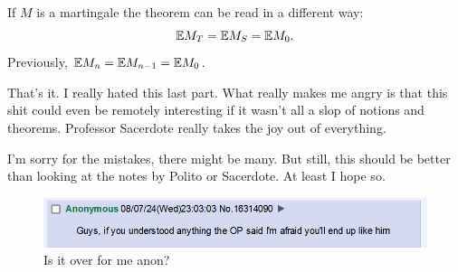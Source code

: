 \documentclass{report}
\begin{document}
\begin{remark}
	If $M$ is a martingale the theorem can be read in a different way:
	\begin{equation*}
		\mathbb{E} M_{T}=\mathbb{E} M_{S}=\mathbb{E} M_{0}.
	\end{equation*}
	Previously, $\mathbb{E} M_{n}=\mathbb{E} M_{n-1}=\mathbb{E} M_{0}$.
\end{remark}
\clearpage
\begin{closethedeal}
	That's it. I really hated this last part. What really makes me angry is that this shit could even be remotely interesting if it wasn't all a slop of notions and theorems. Professor Sacerdote really takes the joy out of everything.\par
	I'm sorry for the mistakes, there might be many. But still, this should be better than looking at the notes by Polito or Sacerdote. At least I hope so. 
	\begin{figure}[h]
		\centering
		\includegraphics[width=\linewidth]{screenshot014}
		\caption[The one and only truth]{Is it over for me anon?}
		\label{fig:screenshot014}
	\end{figure}
\end{closethedeal}
\listoffigures  
\end{document}
